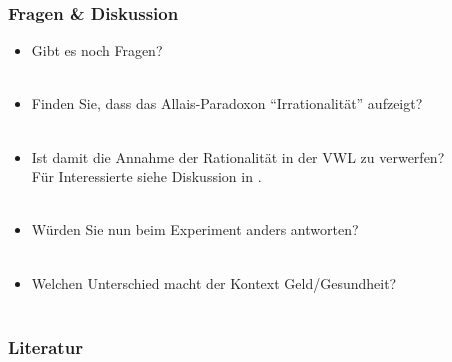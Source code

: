 \documentclass{beamer}
\begin{document}
\begin{frame}
  \frametitle{Fragen \& Diskussion}
  \begin{itemize}
  \item<1> Gibt es noch Fragen?\\~\\
  \item<2-> Finden Sie, dass das Allais-Paradoxon "`Irrationalit\"at"' aufzeigt?\\~\\
  \item<2-> Ist damit die Annahme der Rationalit\"at in der VWL zu verwerfen?\\
    F\"ur Interessierte siehe Diskussion in \textcite[Kapitel 12]{gintis2009bounds}.\\~\\
  \item<2-> W\"urden Sie nun beim Experiment anders antworten?\\~\\
  \item<2-> Welchen Unterschied macht der Kontext Geld/Gesundheit?\\~\\
    
  \end{itemize}
\end{frame}


\begin{frame}[allowframebreaks]
  \frametitle{Literatur}
  \nocite{barbera2004handbook}
  \nocite{gintis2009bounds}
  \nocite{rieck2012spieltheorie}
  \nocite{osborne2004introduction}
  \printbibliography
\end{frame}
\end{document}
